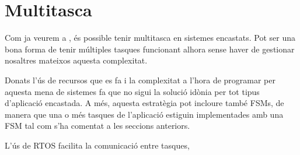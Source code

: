 \section{Multitasca}
\label{sec:multitasca}
Com ja veurem a , és possible tenir multitasca en sistemes encastats. Pot ser una bona forma de tenir múltiples tasques funcionant alhora sense haver de gestionar nosaltres mateixos aquesta complexitat. 

Donats l'ús de recursos que es fa i la complexitat a l'hora de programar per aquesta mena de sistemes fa que no sigui la solució idònia per tot tipus d'aplicació encastada.
A més, aquesta estratègia pot incloure també \glspl{FSM}, de manera que una o més tasques de l'aplicació estiguin implementades amb una FSM tal com s'ha comentat a les seccions anteriors.

L'ús de RTOS facilita la comunicació entre tasques, 

